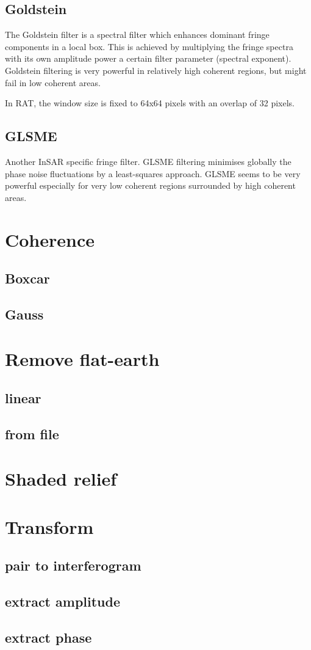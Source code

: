 \subsection{Goldstein}
The Goldstein filter is a spectral filter which enhances
dominant fringe components in a local box. This is achieved by
multiplying the fringe spectra with its own amplitude power a
certain filter parameter (spectral exponent). Goldstein filtering
is very powerful in relatively high coherent regions, but might 
fail in low coherent areas.

In RAT, the window size is fixed to 64x64 pixels with an overlap
of 32 pixels.

\subsection{GLSME}
Another InSAR specific fringe filter. GLSME filtering minimises
globally the phase noise fluctuations by a least-squares approach.
GLSME seems to be very powerful especially for very low
coherent regions surrounded by high coherent areas.


\section{Coherence}
\subsection{Boxcar}
\subsection{Gauss}
\section{Remove flat-earth}
\subsection{linear}
\subsection{from file}
\section{Shaded relief}
\section{Transform}
\subsection{pair to interferogram}
\subsection{extract amplitude}
\subsection{extract phase}
